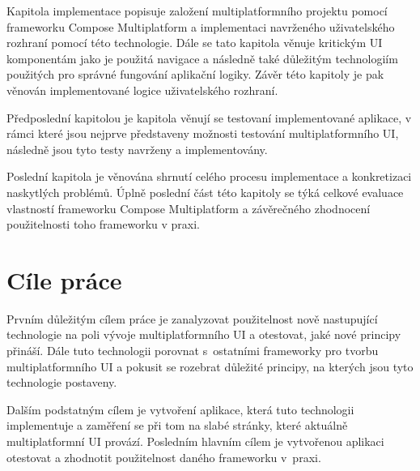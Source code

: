 \medskip

Kapitola implementace popisuje založení multiplatformního projektu pomocí frameworku Compose Multiplatform
a implementaci navrženého uživatelského rozhraní pomocí této technologie. Dále se tato kapitola věnuje kritickým UI komponentám
jako je použitá navigace a následně také důležitým technologiím použitých pro správné fungování aplikační logiky. Závěr této kapitoly
je pak věnován implementované logice uživatelského rozhraní.

\medskip

Předposlední kapitolou je kapitola věnují se testovaní implementované aplikace, v rámci které jsou nejprve představeny možnosti testování
multiplatformního UI, následně jsou tyto testy navrženy a implementovány.


\medskip


Poslední kapitola je věnována shrnutí celého procesu implementace a konkretizaci naskytlých problémů. Úplně poslední část této kapitoly se týká celkové evaluace
vlastností frameworku Compose Multiplatform a závěrečného zhodnocení použitelnosti toho frameworku v praxi.

\newpage

\section{Cíle práce} \label{goals}
Prvním důležitým cílem práce je zanalyzovat použitelnost nově nastupující technologie na poli vývoje multiplatformního UI a otestovat, jaké
nové principy přináší. Dále tuto technologii porovnat s~ostatními frameworky pro tvorbu multiplatformního UI a pokusit se
rozebrat důležité principy, na kterých jsou tyto technologie postaveny. 

Dalším podstatným cílem je vytvoření aplikace, která tuto technologii implementuje a zaměření se při tom na slabé stránky, 
které aktuálně multiplatformní UI provází. 
Posledním hlavním cílem je vytvořenou aplikaci otestovat a zhodnotit použitelnost daného frameworku v~praxi.

